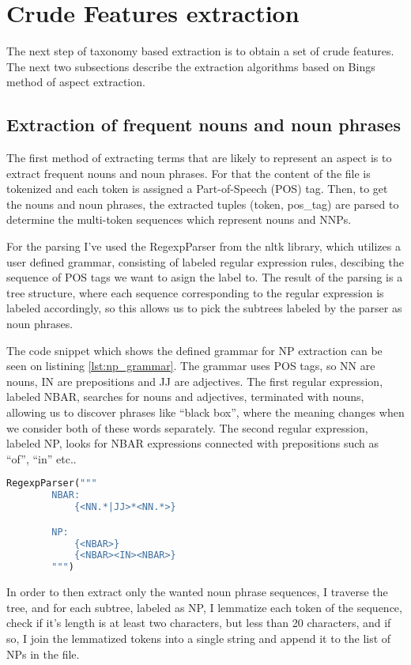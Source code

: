 \section{Crude Features extraction}
The next step of taxonomy based extraction is to obtain a set of crude features. The next two subsections describe the extraction algorithms based on Bings method of aspect extraction.

\subsection{Extraction of frequent nouns and noun phrases}
The first method of extracting terms that are likely to represent an aspect is to extract frequent nouns and noun phrases. For that the content of the file is tokenized and each token is assigned a Part-of-Speech (POS) tag. Then, to get the nouns and noun phrases, the extracted tuples (token, pos\_tag) are parsed to determine the multi-token sequences which represent nouns and NNPs. 

For the parsing I've used the RegexpParser from the nltk library, which utilizes a user defined grammar, consisting of labeled regular expression rules, descibing the sequence of POS tags we want to asign the label to. The result of the parsing is a tree structure, where each sequence corresponding to the regular expression is labeled accordingly, so this allows us to pick the subtrees labeled by the parser as noun phrases. 

The code snippet which shows the defined grammar for NP extraction can be seen on listining \ref{lst:np_grammar}. 
The grammar uses POS tags, so NN are nouns, IN are prepositions and JJ are adjectives. The first regular expression, labeled NBAR, searches for nouns and adjectives, terminated with nouns, allowing us to discover phrases like ``black box'', where the meaning changes when we consider both of these words separately. The second regular expression, labeled NP, looks for NBAR expressions connected with prepositions such as ``of'', ``in'' etc.. \cite{nltk_np}

\begin{lstlisting}[language=python,caption={Grammar for the extraction of noun phrases.}, label={lst:np_grammar}]
RegexpParser("""
        NBAR:
            {<NN.*|JJ>*<NN.*>} 

        NP:
            {<NBAR>}
            {<NBAR><IN><NBAR>}
        """)
\end{lstlisting}

In order to then extract only the wanted noun phrase sequences, I traverse the tree, and for each subtree, labeled as NP, I lemmatize each token of the sequence, check if it's length is at least two characters, but less than 20 characters, and if so, I join the lemmatized tokens into a single string and append it to the list of NPs in the file.

